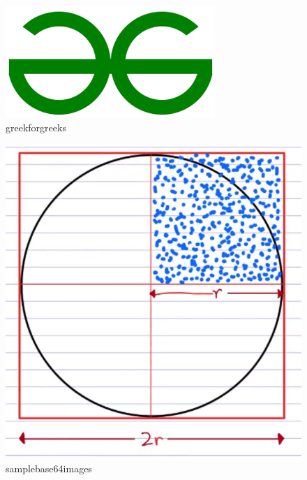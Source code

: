 \documentclass[journal,lettersize]{IEEEtran}%
\begin{document}
    \begin{figure}[!t] 
    \centerline{\includegraphics[width=\linewidth]{image_1.png}}
    \caption{greekforgreeks}
    \label{fig:image_1.png}
    \end{figure}

    \begin{figure}[!t] 
    \centerline{\includegraphics[width=\linewidth]{image_5.jpeg}}
    \caption{samplebase64images}
    \label{fig:image_5.jpeg}
    \end{figure}
\end{document}
